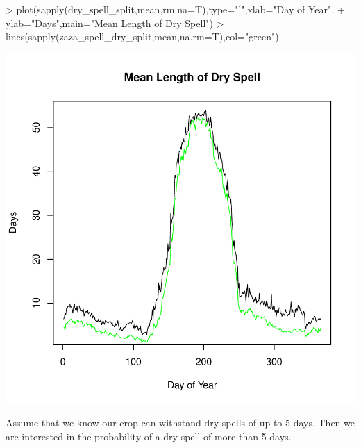 \documentclass{article}
\begin{document}
\begin{Schunk}
\begin{Sinput}
> plot(sapply(dry_spell_split,mean,rm.na=T),type="l",xlab="Day of Year",
+      ylab="Days",main="Mean Length of Dry Spell")
> lines(sapply(zaza_spell_dry_split,mean,na.rm=T),col="green")
\end{Sinput}
\end{Schunk}
\includegraphics{climate_vignette-023}

Assume that we know our crop can withstand dry spells of up to 
5 days.  Then we are interested in the probability of a dry spell
of more than 5 days.  
\end{document}
